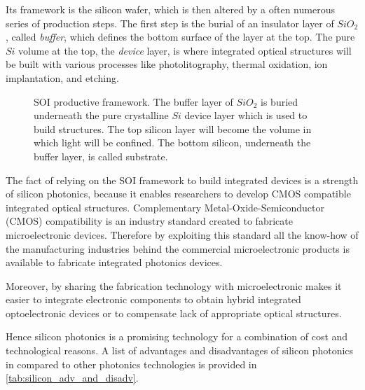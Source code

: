 Its framework is the silicon wafer, which is then altered by a often numerous series of production steps.
The first step is the burial of an insulator layer of $SiO_2$, called \textit{buffer}, which defines the bottom surface of the layer at the top.
The pure $Si$ volume at the top, the \textit{device} layer, is where integrated optical structures will be built with various processes like photolitography, thermal oxidation, ion implantation, and etching.

\begin{figure}[ht]
	\centering
	
	\caption{SOI productive framework.
		The buffer layer of $SiO_2$ is buried underneath the pure crystalline $Si$ device layer which is used to build structures.
		The top silicon layer will become the volume in which light will be confined.
		The bottom silicon, underneath the buffer layer, is called substrate.
		}
	\label{fig:SOI}
\end{figure}

The fact of relying on the SOI framework to build integrated devices is a strength of silicon photonics, because it enables researchers to develop CMOS compatible integrated optical structures.
Complementary Metal-Oxide-Semiconductor (CMOS) compatibility is an industry standard created to fabricate microelectronic devices.
Therefore by exploiting this standard all the know-how of the manufacturing industries behind the commercial microelectronic products is available to fabricate integrated photonics devices.

Moreover, by sharing the fabrication technology with microelectronic makes it easier to integrate electronic components to obtain hybrid integrated optoelectronic devices or to compensate lack of appropriate optical structures.

Hence silicon photonics is a promising technology for a combination of cost and technological reasons.
A list of advantages and disadvantages of silicon photonics in compared to other photonics technologies is provided in \autoref{tab:silicon_adv_and_disadv}.

